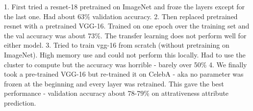\documentclass{article}
\begin{document}
1. First tried a resnet-18 pretrained on ImageNet and froze the layers except for the last one. Had about 63\% validation accuracy. 
2. Then replaced pretrained resnet with a pretrained VGG-16. Trained on one epoch over the training set and the val accuracy was about 73\%. The transfer learning does not perform well for either model. 
3. Tried to train vgg-16 from scratch (without pretraining on ImageNet). High memory use and could not perform this locally. Had to use the cluster to compute but the accuracy was horrible - barely over 50\%
4. We finally took a pre-trained VGG-16 but re-trained it on CelebA - aka no parameter was frozen at the beginning and every layer was retrained. This gave the best performance - validation accuracy about 78-79\% on attrativeness attribute prediction. 
\end{document}
